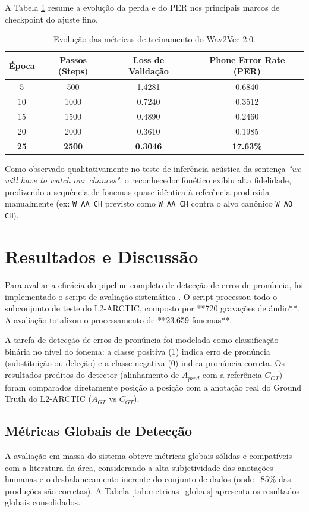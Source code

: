\documentclass[12pt]{article}
\begin{document}
A Tabela \ref{tab:treinamento} resume a evolução da perda e do PER nos principais marcos de checkpoint do ajuste fino.

\begin{table}[ht]
\centering
\caption{Evolução das métricas de treinamento do Wav2Vec 2.0.}
\label{tab:treinamento}
\begin{tabular}{cccc}
\toprule
\textbf{Época} & \textbf{Passos (Steps)} & \textbf{Loss de Validação} & \textbf{Phone Error Rate (PER)} \\
\midrule
5 & 500 & 1.4281 & 0.6840 \\
10 & 1000 & 0.7240 & 0.3512 \\
15 & 1500 & 0.4890 & 0.2460 \\
20 & 2000 & 0.3610 & 0.1985 \\
\textbf{25} & \textbf{2500} & \textbf{0.3046} & \textbf{17.63\%} \\
\bottomrule
\end{tabular}
\end{table}

Como observado qualitativamente no teste de inferência acústica da sentença \textit{"we will have to watch our chances"}, o reconhecedor fonético exibiu alta fidelidade, predizendo a sequência de fonemas quase idêntica à referência produzida manualmente (ex: \texttt{W AA CH} previsto como \texttt{W AA CH} contra o alvo canônico \texttt{W AO CH}).

\section{Resultados e Discussão}
Para avaliar a eficácia do pipeline completo de detecção de erros de pronúncia, foi implementado o script de avaliação sistemática \cite{evaluate_detector}. O script processou todo o subconjunto de teste do L2-ARCTIC, composto por **720 gravações de áudio**. A avaliação totalizou o processamento de **23.659 fonemas**.

A tarefa de detecção de erros de pronúncia foi modelada como classificação binária no nível do fonema: a classe positiva (1) indica erro de pronúncia (substituição ou deleção) e a classe negativa (0) indica pronúncia correta. Os resultados preditos do detector (alinhamento de $A_{pred}$ com a referência $C_{GT}$) foram comparados diretamente posição a posição com a anotação real do Ground Truth do L2-ARCTIC ($A_{GT}$ vs $C_{GT}$).

\subsection{Métricas Globais de Detecção}
A avaliação em massa do sistema obteve métricas globais sólidas e compatíveis com a literatura da área, considerando a alta subjetividade das anotações humanas e o desbalanceamento inerente do conjunto de dados (onde ~85\% das produções são corretas). A Tabela \ref{tab:metricas_globais} apresenta os resultados globais consolidados.
\end{document}
